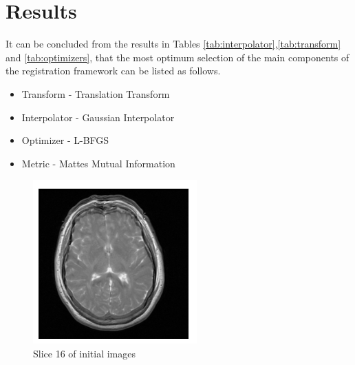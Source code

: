 \documentclass[11pt,english]{article}
\begin{document}
\section*{Results}
It can be concluded from the results in Tables \ref{tab:interpolator},\ref{tab:transform} and \ref{tab:optimizers}, that the most optimum selection of the main components of the registration framework can be listed as follows. 
\begin{itemize}
    \item Transform - Translation Transform  
    \item Interpolator - Gaussian Interpolator
    \item Optimizer - \gls{L-BFGS}
    \item Metric - Mattes Mutual Information
\end{itemize}
\begin{figure}[h!]
    \centering
    \begin{minipage}[b]{0.22\textwidth}
        \includegraphics[width = \textwidth]{images/initialOverlap.PNG}
        \caption{Slice 16 of initial images}
        \label{fig:initialOverlap}
      \end{minipage}
    \begin{minipage}[b]{0.22\textwidth}

\end{minipage}
\end{figure}
\end{document}
